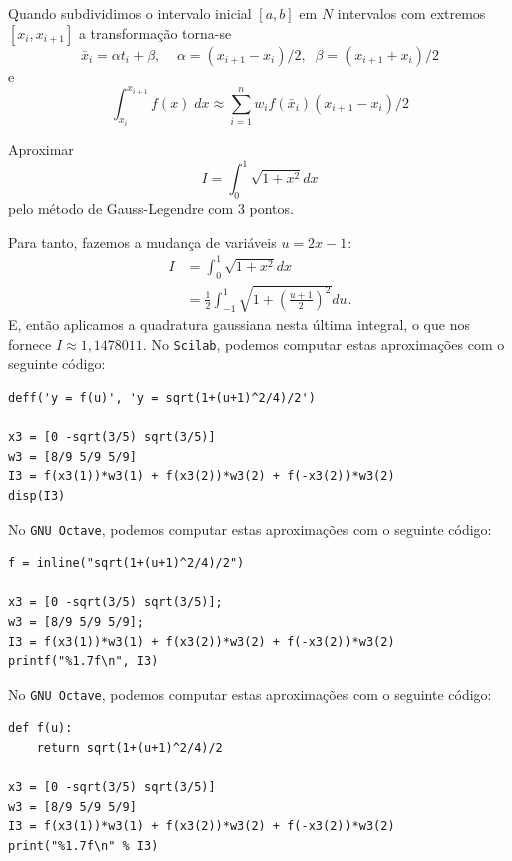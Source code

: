 Quando subdividimos o intervalo inicial $[a,b]$ em $N$ intervalos com extremos $[x_i,x_{i+1}]$ a transformação torna-se
$$
  \bar{x}_i = \alpha t_i + \beta, \;\;  \;\; \alpha =(x_{i+1}-x_i)/2, \;\; \beta = (x_{i+1}+x_i)/2 
$$
e
$$
 \int_{x_i}^{x_{i+1}} f(x) \; dx \approx \sum_{i=1}^n w_i f( \bar{x}_i ) (x_{i+1}-x_i)/2
$$

\begin{ex} Aproximar
$$I = \int_{0}^1\sqrt{1+x^2}dx$$
pelo método de Gauss-Legendre com 3 pontos.
\end{ex}
\begin{sol}
Para tanto, fazemos a mudança de variáveis $u=2x-1$:
\begin{equation*}
  \begin{split}
    I &= \int_{0}^1\sqrt{1+x^2}dx\\
    &= \frac{1}{2}\int_{-1}^1\sqrt{1+\left(\frac{u+1}{2}\right)^2}du.
  \end{split}
\end{equation*}
E, então aplicamos a quadratura gaussiana nesta última integral, o que nos fornece $I \approx 1,1478011$.
\ifisscilab
No \verb+Scilab+, podemos computar estas aproximações com o seguinte código:
\begin{verbatim}
deff('y = f(u)', 'y = sqrt(1+(u+1)^2/4)/2')

x3 = [0 -sqrt(3/5) sqrt(3/5)]
w3 = [8/9 5/9 5/9]
I3 = f(x3(1))*w3(1) + f(x3(2))*w3(2) + f(-x3(2))*w3(2)
disp(I3)
\end{verbatim}
\fi  
\ifisoctave
No \verb+GNU Octave+, podemos computar estas aproximações com o seguinte código:
\begin{verbatim}
f = inline("sqrt(1+(u+1)^2/4)/2")

x3 = [0 -sqrt(3/5) sqrt(3/5)];
w3 = [8/9 5/9 5/9];
I3 = f(x3(1))*w3(1) + f(x3(2))*w3(2) + f(-x3(2))*w3(2)
printf("%1.7f\n", I3)
\end{verbatim}
\fi  
\ifispython
No \verb+GNU Octave+, podemos computar estas aproximações com o seguinte código:
\begin{verbatim}
def f(u):
    return sqrt(1+(u+1)^2/4)/2

x3 = [0 -sqrt(3/5) sqrt(3/5)]
w3 = [8/9 5/9 5/9]
I3 = f(x3(1))*w3(1) + f(x3(2))*w3(2) + f(-x3(2))*w3(2)
print("%1.7f\n" % I3)
\end{verbatim}
\fi  
\end{sol}


